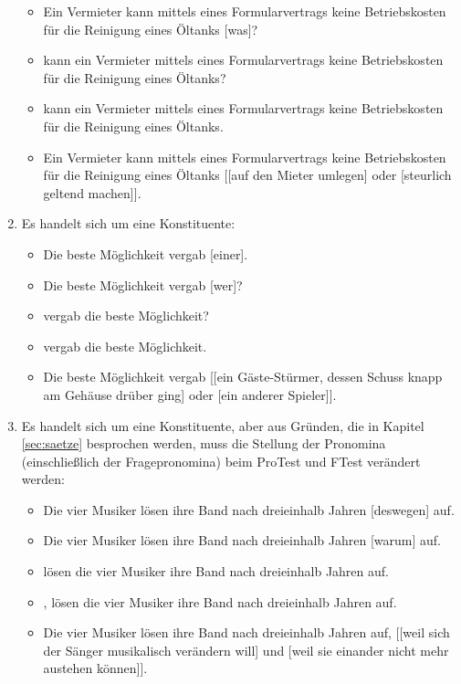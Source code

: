 \begin{enumerate}
\begin{itemize}
      \item \FTest \Ast Ein Vermieter kann mittels eines Formularvertrags keine Betriebskosten für die Reinigung eines Öltanks [was]?
      \item \FTest \Ast [Was] kann ein Vermieter mittels eines Formularvertrags keine Betriebskosten für die Reinigung eines Öltanks?
      \item {} kann ein Vermieter mittels eines Formularvertrags keine Betriebskosten für die Reinigung eines Öltanks.
      \item \KoorTest Ein Vermieter kann mittels eines Formularvertrags keine Betriebskosten für die Reinigung eines Öltanks [[auf den Mieter umlegen] oder [steurlich geltend machen]].
    \end{itemize}
  \item Es handelt sich um eine Konstituente:
    \begin{itemize}\Lf
      \item \ProTest Die beste Möglichkeit vergab [einer].
      \item \FTest Die beste Möglichkeit vergab [wer]?
      \item \FTest [Wer] vergab die beste Möglichkeit?
      \item {} vergab die beste Möglichkeit.
      \item \KoorTest Die beste Möglichkeit vergab [[ein Gäste-Stürmer, dessen Schuss knapp am Gehäuse drüber ging] oder [ein anderer Spieler]].
    \end{itemize}
  \item Es handelt sich um eine Konstituente, aber aus Gründen, die in Kapitel \ref{sec:saetze} besprochen werden, muss die Stellung der Pronomina (einschließlich der Fragepronomina) beim ProTest und FTest verändert werden:
    \begin{itemize}\Lf
      \item \ProTest Die vier Musiker lösen ihre Band nach dreieinhalb Jahren [deswegen] auf.
      \item \FTest Die vier Musiker lösen ihre Band nach dreieinhalb Jahren [warum] auf.
      \item \FTest [Warum] lösen die vier Musiker ihre Band nach dreieinhalb Jahren auf.
      \item {}, lösen die vier Musiker ihre Band nach dreieinhalb Jahren auf.
      \item \KoorTest Die vier Musiker lösen ihre Band nach dreieinhalb Jahren auf, [[weil sich der Sänger musikalisch verändern will] und [weil sie einander nicht mehr austehen können]].

\end{itemize}
\end{enumerate}
